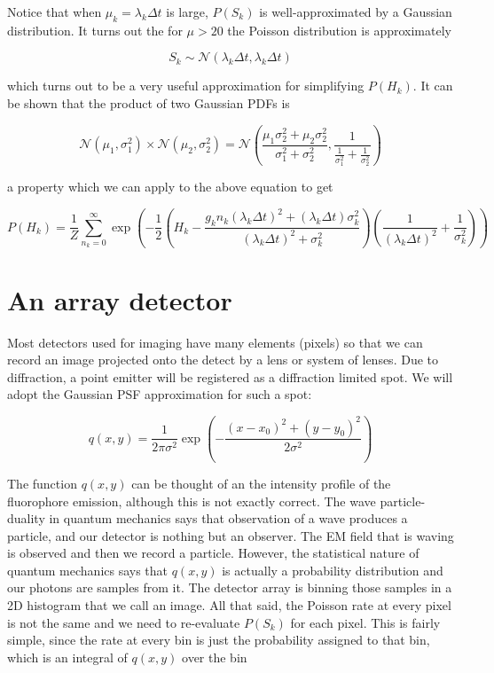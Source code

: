 \documentclass{article}
\begin{document}
Notice that when $\mu_{k} = \lambda_{k}\Delta t$ is large, $P(S_{k})$ is well-approximated by a Gaussian distribution. It turns out the for $\mu > 20$ the Poisson distribution is approximately 

\begin{equation*}
S_{k} \sim \mathcal{N}(\lambda_{k}\Delta t, \lambda_{k}\Delta t)
\end{equation*} 

which turns out to be a very useful approximation for simplifying $P(H_{k})$. It can be shown that the product of two Gaussian PDFs is

\begin{equation*}
\mathcal{N}(\mu_{1},\sigma_{1}^{2}) \times \mathcal{N}(\mu_{2},\sigma_{2}^{2}) = \mathcal{N}\left(\frac{\mu_{1}\sigma_{2}^{2} + \mu_{2}\sigma_{2}^{2}}{\sigma_{1}^{2}+\sigma_{2}^{2}}, \frac{1}{\frac{1}{\sigma_{1}^{2}}+\frac{1}{\sigma_{2}^{2}}}\right)
\end{equation*}

a property which we can apply to the above equation to get

\begin{equation*}
P(H_{k}) = \frac{1}{Z}\sum_{n_{k}=0}^{\infty}\exp\left(-\frac{1}{2}\left(H_{k}-\frac{g_{k}n_{k}(\lambda_{k}\Delta t)^{2} +  (\lambda_{k}\Delta t)\sigma_{k}^{2}}{(\lambda_{k}\Delta t)^{2}+\sigma_{k}^{2}}\right)\left(\frac{1}{(\lambda_{k}\Delta t)^{2}}+\frac{1}{\sigma_{k}^{2}}\right)\right)
\end{equation*}

\section{An array detector}

Most detectors used for imaging have many elements (pixels) so that we can record an image projected onto the detect by a lens or system of lenses. Due to diffraction, a point emitter will be registered as a diffraction limited spot. We will adopt the Gaussian PSF approximation for such a spot:

\begin{equation*}
q(x,y) = \frac{1}{2\pi\sigma^{2}}\exp\left(-\frac{(x-x_{0})^{2}+(y-y_{0})^{2}}{2\sigma^{2}}\right)
\end{equation*}

The function $q(x,y)$ can be thought of an the intensity profile of the fluorophore emission, although this is not exactly correct. The wave particle-duality in quantum mechanics says that observation of a wave produces a particle, and our detector is nothing but an observer. The EM field that is waving is observed and then we record a particle. However, the statistical nature of quantum mechanics says that $q(x,y)$ is actually a probability distribution and our photons are samples from it. The detector array is binning those samples in a 2D histogram that we call an image. All that said, the Poisson rate at every pixel is not the same and we need to re-evaluate $P(S_{k})$ for each pixel. This is fairly simple, since the rate at every bin is just the probability assigned to that bin, which is an integral of $q(x,y)$ over the bin
\end{document}
